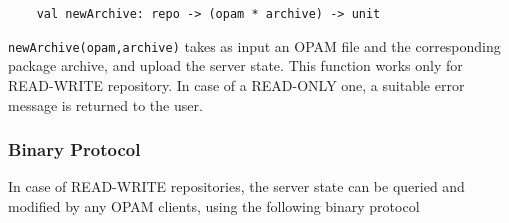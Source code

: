 \documentclass[a4paper,11pt]{article}
\begin{document}
\begin{verbatim}
    val newArchive: repo -> (opam * archive) -> unit
\end{verbatim}

{\tt newArchive(opam,archive)} takes as input an OPAM file and the
corresponding package archive, and upload the server state. This
function works only for READ-WRITE repository. In case of a READ-ONLY
one, a suitable error message is returned to the user.

\subsubsection{Binary Protocol}

In case of READ-WRITE repositories, the server state can be queried
and modified by any OPAM clients, using the following binary protocol
\end{document}
